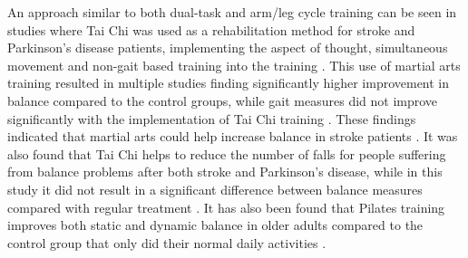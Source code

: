 An approach similar to both dual-task and arm/leg cycle training can be seen in studies where Tai Chi was used as a rehabilitation method for stroke and Parkinson's disease patients, implementing the aspect of thought, simultaneous movement and non-gait based training into the training \cite{Ding2012,Winser2018}. This use of martial arts training resulted in multiple studies finding significantly higher improvement in balance compared to the control groups, while gait measures did not improve significantly with the implementation of Tai Chi training \cite{Ding2012}.
These findings indicated that martial arts could help increase balance in stroke patients \cite{Ding2012}. It was also found that Tai Chi helps to reduce the number of falls for people suffering from balance problems after both stroke and Parkinson's disease, while in this study it did not result in a significant difference between balance measures compared with regular treatment \cite{Winser2018}. It has also been found that Pilates training improves both static and dynamic balance in older adults compared to the control group that only did their normal daily activities \cite{Moreno2017}.